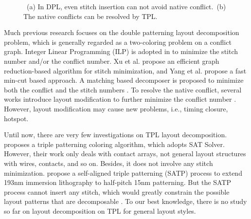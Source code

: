 \documentclass[10pt,conference]{IEEEtran}
\begin{document}
\begin{figure}[bt]
    \centering
    \caption{~(a) In DPL, even stitch insertion can not avoid native conflict.~(b) The native conflicts can be resolved by TPL.}
    \label{fig:TPL}
\end{figure}

Much previous research focuses on the double patterning layout decomposition problem, which is generally regarded as a two-coloring problem on a conflict graph.
Integer Linear Programming (ILP) is adopted in \cite{DPL_ICCAD08_Kahng}\cite{DPL_ISPD09_Yuan} to minimize the stitch number and/or the conflict number.
Xu et al. \cite{DPL_ICCAD09_Xu} propose an efficient graph reduction-based algorithm for stitch minimization,
and Yang et al. \cite{DPL_ASPDAC2010_Yang} propose a fast min-cut based approach.
A matching based decomposer is proposed to minimize both the conflict and the stitch numbers \cite{DPL_ISPD2010_Xu}.
To resolve the native conflict, several works introduce layout modification to further minimize the conflict number \cite{DPL_ICCAD2010_Yuan}\cite{DPL_ICCAD2010_Chen}\cite{DPL_ICCAD09_Hsu}.
However, layout modification may cause new problems, i.e., timing closure, hotspot.


Until now, there are very few investigations on TPL layout decomposition.
\cite{TPL_SPIE08_Cork} proposes a triple patterning coloring algorithm, which adopts SAT Solver. However, their work only deals with contact arrays, not general layout structures with wires, contacts, and so on. Besides, it does not involve any stitch minimization.
\cite{TPL_SPIE2011_Chen}\cite{TPL_SPIE2011_Mebarki} propose a self-aligned triple patterning (SATP) process to extend 193nm immersion lithography to half-pitch 15nm patterning.
But the SATP process cannot insert any stitch, which would greatly constrain the possible layout patterns that are decomposable \cite{SADP_2010_Li}.  To our best knowledge, there is no study so far on layout decomposition on TPL for general layout styles. 
\end{document}
